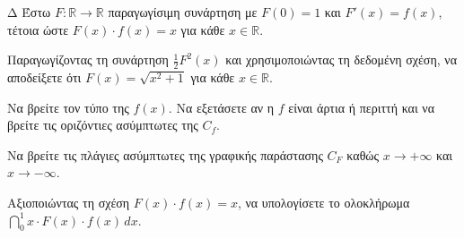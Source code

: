 \begin{thema}{Δ}
Έστω $F: \mathbb{R} \to \mathbb{R}$ παραγωγίσιμη συνάρτηση με $F(0) = 1$ και $F'(x) = f(x)$, τέτοια ώστε $F(x) \cdot f(x) = x$ για κάθε $x \in \mathbb{R}$.
\begin{erwthma}
    \item Παραγωγίζοντας τη συνάρτηση $\tfrac{1}{2}F^2(x)$ και χρησιμοποιώντας τη δεδομένη σχέση, να αποδείξετε ότι $F(x) = \sqrt{x^2+1}$ για κάθε $x \in \mathbb{R}$.
    \item Να βρείτε τον τύπο της $f(x)$. Να εξετάσετε αν η $f$ είναι άρτια ή περιττή και να βρείτε τις οριζόντιες ασύμπτωτες της $C_f$.
    \item Να βρείτε τις πλάγιες ασύμπτωτες της γραφικής παράστασης $C_F$ καθώς $x \to +\infty$ και $x \to -\infty$.
    \item Αξιοποιώντας τη σχέση $F(x) \cdot f(x) = x$, να υπολογίσετε το ολοκλήρωμα $\displaystyle\dint_0^1 x \cdot F(x) \cdot f(x)\,dx$.
\end{erwthma}
\end{thema}
